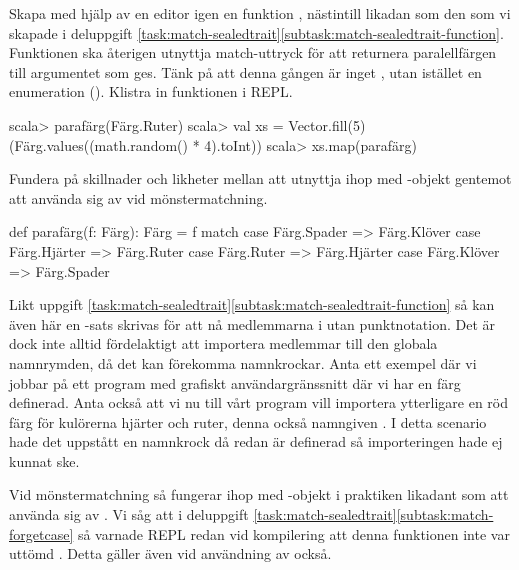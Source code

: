 \Subtask Skapa med hjälp av en editor igen en funktion , nästintill likadan som den som vi skapade i deluppgift \ref{task:match-sealedtrait}\ref{subtask:match-sealedtrait-function}. Funktionen ska återigen utnyttja match-uttryck för att returnera paralellfärgen till argumentet som ges. Tänk på att denna gången är  inget , utan istället en enumeration (). Klistra in funktionen i REPL.
\begin{REPL}
scala> parafärg(Färg.Ruter)
scala> val xs = Vector.fill(5)(Färg.values((math.random() * 4).toInt))
scala> xs.map(parafärg)
\end{REPL}


\Subtask
Fundera på skillnader och likheter mellan att utnyttja  ihop med -objekt gentemot att använda sig av  vid mönstermatchning.


\SOLUTION


\TaskSolved \what
\SubtaskSolved
\begin{Code}
def parafärg(f: Färg): Färg = f match
  case Färg.Spader  => Färg.Klöver
  case Färg.Hjärter => Färg.Ruter
  case Färg.Ruter   => Färg.Hjärter
  case Färg.Klöver  => Färg.Spader
\end{Code}
Likt uppgift \ref{task:match-sealedtrait}\ref{subtask:match-sealedtrait-function} så kan även här en -sats skrivas för att nå medlemmarna i  utan punktnotation.
Det är dock inte alltid fördelaktigt att importera medlemmar till den globala namnrymden, då det kan förekomma namnkrockar. Anta ett exempel där vi jobbar på ett program med grafiskt användargränssnitt där vi har en färg  definerad.
Anta också att vi nu till vårt program vill importera ytterligare en röd färg för kulörerna hjärter och ruter, denna också namngiven . I detta scenario hade det uppstått en namnkrock då  redan är definerad så importeringen hade ej kunnat ske.

\SubtaskSolved
Vid mönstermatchning så fungerar  ihop med -objekt i praktiken likadant som att använda sig av . 
Vi såg att i deluppgift \ref{task:match-sealedtrait}\ref{subtask:match-forgetcase} så varnade REPL redan vid kompilering att denna funktionen inte var uttömd . Detta gäller även vid användning av  också.

\QUESTEND





